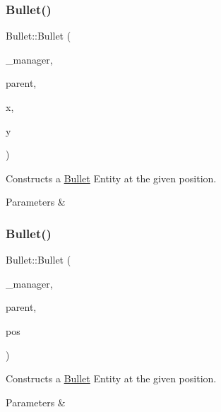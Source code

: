 \subsubsection{\texorpdfstring{Bullet()}{Bullet()}\hspace{0.1cm}{\footnotesize\ttfamily [2/3]}}
{\footnotesize\ttfamily Bullet\+::\+Bullet (\begin{DoxyParamCaption}\item[{\mbox{\hyperlink{class_game_manager}{Game\+Manager}} $\ast$}]{\+\_\+manager,  }\item[{\mbox{\hyperlink{class_game_entity}{Game\+Entity}} $\ast$}]{parent,  }\item[{float}]{x,  }\item[{float}]{y }\end{DoxyParamCaption})}



Constructs a \mbox{\hyperlink{class_bullet}{Bullet}} Entity at the given position. 


\begin{DoxyParams}{Parameters}
{\em } & \\
\hline
\end{DoxyParams}
\mbox{\label{class_bullet_af56940d89d68f8b552611695e4107c80}} 
\subsubsection{\texorpdfstring{Bullet()}{Bullet()}\hspace{0.1cm}{\footnotesize\ttfamily [3/3]}}
{\footnotesize\ttfamily Bullet\+::\+Bullet (\begin{DoxyParamCaption}\item[{\mbox{\hyperlink{class_game_manager}{Game\+Manager}} $\ast$}]{\+\_\+manager,  }\item[{\mbox{\hyperlink{class_game_entity}{Game\+Entity}} $\ast$}]{parent,  }\item[{\mbox{\hyperlink{classsf_1_1_vector2}{sf\+::\+Vector2f}}}]{pos }\end{DoxyParamCaption})}



Constructs a \mbox{\hyperlink{class_bullet}{Bullet}} Entity at the given position. 


\begin{DoxyParams}{Parameters}
{\em } & \\
\hline
\end{DoxyParams}


